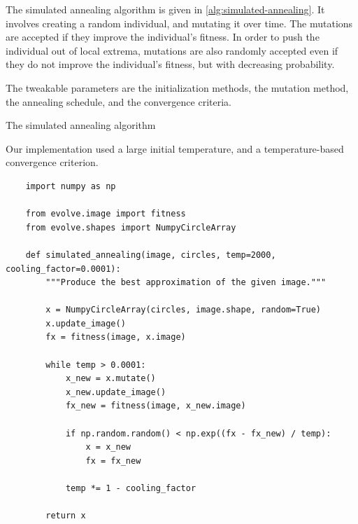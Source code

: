 \documentclass{article}
\begin{document}
The simulated annealing algorithm is given in \autoref{alg:simulated-annealing}. It involves
creating a random individual, and mutating it over time. The mutations are accepted if they improve
the individual's fitness. In order to push the individual out of local extrema, mutations are also
randomly accepted even if they do not improve the individual's fitness, but with decreasing
probability.

The tweakable parameters are the initialization methods, the mutation method, the annealing
schedule, and the convergence criteria.

\begin{algorithm}[H]
    \begin{algorithmic}
                \EndIf{}
            \EndWhile{}
            \State{}
        \EndFunction{}
    \end{algorithmic}
    \caption{The simulated annealing algorithm}\label{alg:simulated-annealing}
\end{algorithm}

Our implementation used a large initial temperature, and a temperature-based convergence criterion.

\begin{verbatim}
    import numpy as np

    from evolve.image import fitness
    from evolve.shapes import NumpyCircleArray

    def simulated_annealing(image, circles, temp=2000, cooling_factor=0.0001):
        """Produce the best approximation of the given image."""

        x = NumpyCircleArray(circles, image.shape, random=True)
        x.update_image()
        fx = fitness(image, x.image)

        while temp > 0.0001:
            x_new = x.mutate()
            x_new.update_image()
            fx_new = fitness(image, x_new.image)

            if np.random.random() < np.exp((fx - fx_new) / temp):
                x = x_new
                fx = fx_new

            temp *= 1 - cooling_factor

        return x
\end{verbatim}
\end{document}

